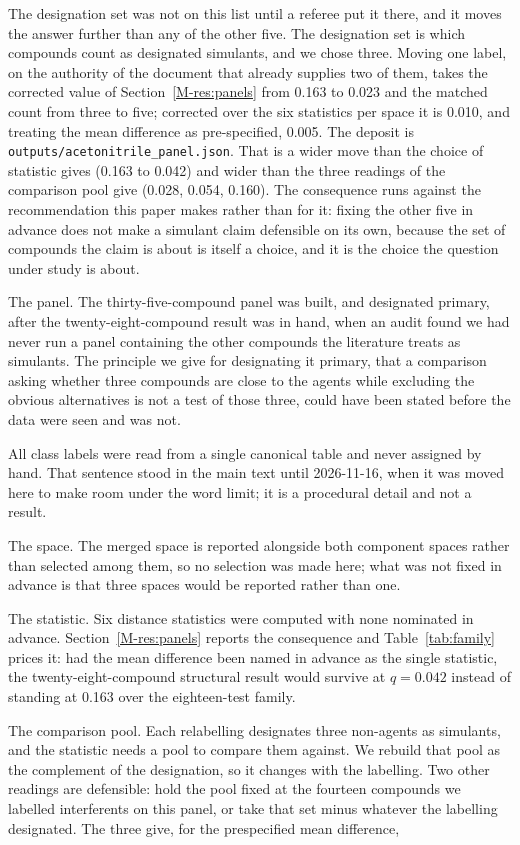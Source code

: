 \documentclass[11pt,a4paper]{article}
\begin{document}
The designation set was not on this list until a referee put it there, and it moves the
answer further than any of the other five. The designation set is which
compounds count as designated simulants, and we chose three. Moving one label,
on the authority of the document that already supplies two of them, takes the
corrected value of Section~\ref{M-res:panels} from 0.163 to 0.023 and the
matched count from three to five; corrected over the six statistics per space
it is 0.010, and treating the mean difference as pre-specified, 0.005. The
deposit is
\texttt{outputs/acetonitrile\_panel.json}. That is a wider move than the choice of statistic gives
(0.163 to 0.042) and wider than the three readings of the comparison pool give
(0.028, 0.054, 0.160). The consequence runs against the recommendation this
paper makes rather than for it: fixing the other five in advance does not make
a simulant claim defensible on its own, because the set of compounds the claim
is about is itself a choice, and it is the choice the question under study is
about.

The panel. The thirty-five-compound panel was built, and designated primary,
after the twenty-eight-compound result was in hand, when an audit found we had
never run a panel containing the other compounds the literature treats as
simulants. The principle we give for designating it primary, that a
comparison asking whether three compounds are close to the agents while
excluding the obvious alternatives is not a test of those three, could have
been stated before the data were seen and was not.

All class labels were read from a single canonical table and never assigned by hand. That sentence stood in the main text until 2026-11-16, when it was moved here to make room under the word limit; it is a procedural detail and not a result.

The space. The merged space is reported alongside both component spaces rather
than selected among them, so no selection was made here; what was not fixed in
advance is that three spaces would be reported rather than one.

The statistic. Six distance statistics were computed with none nominated in
advance. Section~\ref{M-res:panels} reports the consequence and
Table~\ref{tab:family} prices it: had the mean difference been named in advance
as the single statistic, the twenty-eight-compound structural result would
survive at $q = 0.042$ instead of standing at 0.163 over the eighteen-test
family.

The comparison pool. Each relabelling designates three non-agents as simulants,
and the statistic needs a pool to compare them against. We rebuild that pool as
the complement of the designation, so it changes with the labelling. Two other
readings are defensible: hold the pool fixed at the fourteen compounds we
labelled interferents on this panel, or take that set minus whatever the labelling designated.
The three give, for the prespecified mean difference,
\end{document}
